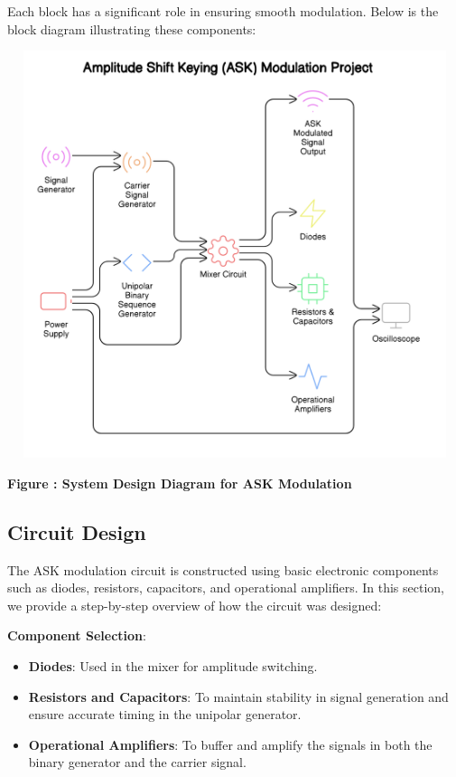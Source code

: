 \documentclass[12pt,a4paper]{article}
\begin{document}
Each block has a significant role in ensuring smooth modulation. Below is the block diagram illustrating these components:
\begin{center}
    {\includegraphics[width=550px, height=450px]{SD.png}}
    \parbox{0.8\textwidth}{ 
        \centering
        \textbf{Figure : System Design Diagram for ASK Modulation}
    }
\end{center}

\subsection*{Circuit Design}
The ASK modulation circuit is constructed using basic electronic components such as diodes, resistors, capacitors, and operational amplifiers. In this section, we provide a step-by-step overview of how the circuit was designed:

\textbf{Component Selection}:
\begin{itemize}
    \item \textbf{Diodes}: Used in the mixer for amplitude switching.
    \item \textbf{Resistors and Capacitors}: To maintain stability in signal generation and ensure accurate timing in the unipolar generator.
    \item \textbf{Operational Amplifiers}: To buffer and amplify the signals in both the binary generator and the carrier signal.
\end{itemize}
\end{document}

